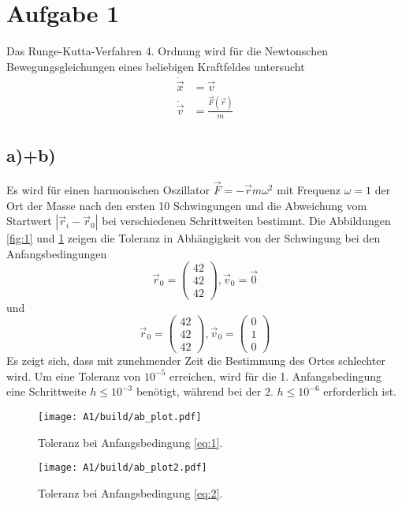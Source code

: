 \section*{Aufgabe 1}

Das Runge-Kutta-Verfahren 4. Ordnung wird für die Newtonschen Bewegungsgleichungen eines beliebigen Kraftfeldes untersucht
\begin{align*}
\dot{\vec{x}} &= \vec{v}\\
\dot{\vec{v}} &= \frac{\vec{F}(\vec{r})}{m}
\end{align*}
\subsection*{a)+b)}
Es wird für einen harmonischen Oszillator $\vec{F}= -\vec{r}m\omega^2$ mit Frequenz $\omega=1$ der Ort der Masse nach den ersten 10 Schwingungen und die Abweichung vom Startwert $|\vec{r}_i-\vec{r}_0|$ bei verschiedenen Schrittweiten bestimmt.
Die Abbildungen \ref{fig:1} und \ref{fig:2} zeigen die Toleranz in Abhängigkeit von der Schwingung bei den Anfangsbedingungen
\begin{equation}
\vec{r}_0 = \begin{pmatrix}
42\\
42\\
42
\end{pmatrix}, \vec{v}_0 = \vec{0}\label{eq:1}
\end{equation}
und
\begin{equation}
\vec{r}_0 = \begin{pmatrix}
42\\
42\\
42
\end{pmatrix}, \vec{v}_0 = \begin{pmatrix}
0\\
1\\
0
\end{pmatrix}\label{eq:2}
\end{equation}
Es zeigt sich, dass mit zunehmender Zeit die Bestimmung des Ortes schlechter wird. Um eine Toleranz von $10^{-5}$ erreichen, wird für die 1. Anfangsbedingung eine Schrittweite $h \leq 10^{-3}$ benötigt, während bei der 2. $h \leq 10^{-6}$ erforderlich ist.

\begin{figure}[h]
\centering
\texttt{[image: A1/build/ab\_plot.pdf]}
\caption{Toleranz bei Anfangsbedingung \eqref{eq:1}.}
\label{fig:1}
\texttt{[image: A1/build/ab\_plot2.pdf]}
\caption{Toleranz bei Anfangsbedingung \eqref{eq:2}.}
\label{fig:2}
\end{figure}

